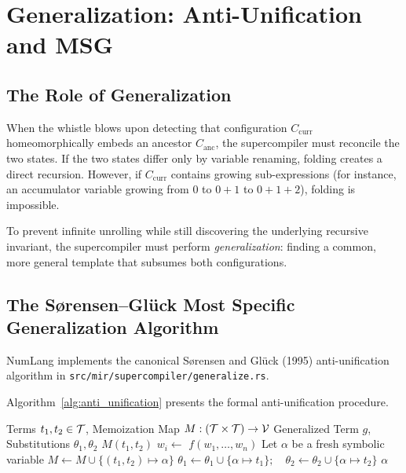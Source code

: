\chapter{Generalization: Anti-Unification and MSG}
\label{chap:generalization}

\section{The Role of Generalization}
\label{sec:generalization:role}

When the whistle blows upon detecting that configuration $C_{\text{curr}}$ homeomorphically embeds an ancestor $C_{\text{anc}}$, the supercompiler must reconcile the two states. If the two states differ only by variable renaming, folding creates a direct recursion. However, if $C_{\text{curr}}$ contains growing sub-expressions (for instance, an accumulator variable growing from $0$ to $0 + 1$ to $0 + 1 + 2$), folding is impossible.

To prevent infinite unrolling while still discovering the underlying recursive invariant, the supercompiler must perform \emph{generalization}: finding a common, more general template that subsumes both configurations.

\section{The S\o{}rensen--Gl\"uck Most Specific Generalization Algorithm}
\label{sec:generalization:msg_alg}

NumLang implements the canonical S\o{}rensen and Gl\"uck (1995) anti-unification algorithm \citep{sorensen1995algorithm} in \texttt{src/mir/supercompiler/generalize.rs}.

Algorithm~\ref{alg:anti_unification} presents the formal anti-unification procedure.

\begin{algorithm}[h!]
\caption{The Most Specific Generalization (Anti-Unification) Algorithm}
\label{alg:anti_unification}
\begin{algorithmic}[1]
\Require Terms $t_1, t_2 \in \mathcal{T}$, Memoization Map $M : (\mathcal{T} \times \mathcal{T}) \to \mathcal{V}$
\Ensure Generalized Term $g$, Substitutions $\theta_1, \theta_2$
        \State \Return $M(t_1, t_2)$
    \EndIf
            \State $w_i \gets$ 
        \EndFor
        \State \Return $f(w_1, \dots, w_n)$
    \Else
        \State Let $\alpha$ be a fresh symbolic variable
        \State $M \gets M \cup \{(t_1, t_2) \mapsto \alpha\}$
        \State $\theta_1 \gets \theta_1 \cup \{\alpha \mapsto t_1\}; \quad \theta_2 \gets \theta_2 \cup \{\alpha \mapsto t_2\}$
        \State \Return $\alpha$
    \EndIf
\EndProcedure
\end{algorithmic}
\end{algorithm}

